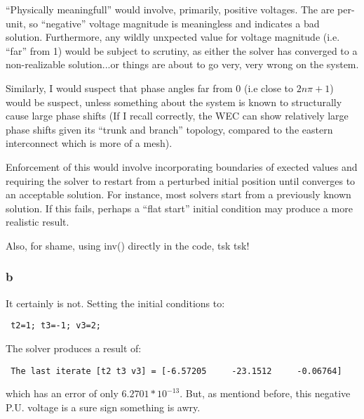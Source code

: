 \documentclass[11pt]{report}
\theoremstyle{definition}
\begin{document}
``Physically meaningfull'' would involve, primarily, positive voltages. The are per-unit,
so ``negative'' voltage magnitude is meaningless and indicates a bad solution. Furthermore,
any wildly unxpected value for voltage magnitude (i.e. ``far'' from 1) would be subject to
scrutiny, as either the solver has converged to a non-realizable solution...or things are about to
go very, very wrong on the system.

Similarly, I would suspect that phase angles far from $0$ (i.e close to $2n\pi+1$) would be
suspect, unless something about the system is known to structurally cause large phase shifts (If I recall
correctly, the WEC can show relatively large phase shifts given its ``trunk and branch'' topology,
compared to the eastern interconnect which is more of a mesh).

Enforcement of this would involve incorporating boundaries of exected values and requiring the
solver to restart from a perturbed initial position until converges to an acceptable solution. For
instance, most solvers start from a previously known solution. If this fails, perhaps a ``flat start''
initial condition may produce a more realistic result.

Also, for shame, using inv() directly in the code, tsk tsk!

\subsubsection*{b}
It certainly is not. Setting the initial conditions to:
\begin{verbatim} t2=1; t3=-1; v3=2; \end{verbatim}
The solver produces a result of:
\begin{verbatim} The last iterate [t2 t3 v3] = [-6.57205     -23.1512     -0.06764] \end{verbatim}
which has an error of only $6.2701*10^{-13}$. But, as mentiond before, this negative P.U. voltage
is a sure sign something is awry.

\end{document}
